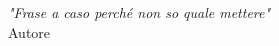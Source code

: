 \begin{titlepage}

\nonumber
\null {}
	\begin{flushright}
\textit{"Frase a caso perché non so quale mettere"} \\[5mm]
	Autore
	\end{flushright}
\null

\end{titlepage}
\cleardoublepage